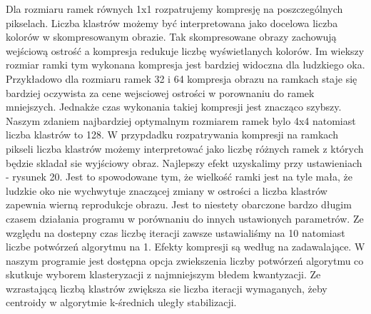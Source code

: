 \documentclass{classrep}
\begin{document}
{        Dla rozmiaru ramek równych 1x1 rozpatrujemy kompresję na poszczególnych pikselach. Liczba klastrów możemy być
        interpretowana jako docelowa liczba kolorów w skompresowanym obrazie. Tak skompresowane obrazy zachowują wejściową
        ostrość a kompresja redukuje liczbę wyświetlanych kolorów. Im wiekszy rozmiar ramki tym wykonana kompresja jest
        bardziej widoczna dla ludzkiego oka. Przykładowo dla rozmiaru ramek 32 i 64 kompresja obrazu na ramkach staje się
        bardziej oczywista za cene wejsciowej ostrości w porownaniu do ramek mniejszych. Jednakże czas wykonania takiej
        kompresji jest znacząco szybszy. Naszym zdaniem najbardziej optymalnym rozmiarem ramek bylo 4x4 natomiast liczba
        klastrów to 128. W przypdadku rozpatrywania kompresji na ramkach pikseli liczba klastrów możemy interpretować
        jako liczbę różnych ramek z których będzie skladał sie wyjściowy obraz. Najlepszy efekt uzyskalimy przy
        ustawieniach - rysunek 20. Jest to spowodowane tym, że wielkość ramki jest na tyle mała, że ludzkie oko nie
        wychwytuje znaczącej zmiany w ostrości a liczba klastrów zapewnia wierną reprodukcje obrazu. Jest to niestety
        obarczone bardzo długim czasem działania programu w porównaniu do innych ustawionych parametrów. Ze względu na
        dostepny czas liczbę iteracji zawsze ustawialiśmy na 10 natomiast liczbe potwórzeń algorytmu na 1. Efekty
        kompresji są według na zadawalające. W naszym programie jest dostępna opcja zwiekszenia liczby potwórzeń
        algorytmu co skutkuje wyborem klasteryzacji z najmniejszym błedem kwantyzacji. Ze wzrastającą liczbą
        klastrów zwiększa sie liczba iteracji wymaganych, żeby centroidy w algorytmie k-średnich uległy stabilizacji.

    }
\end{document}
